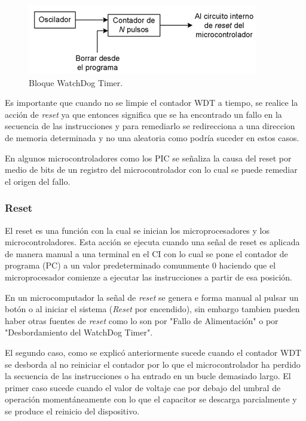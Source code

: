 \documentclass[letterpaper,12pt,oneside]{book}
\begin{document}
				\begin{figure}[!htpb]
					\centering
					\includegraphics[scale = 1.0]{Material de Consulta/BloqWDT.PNG}
					\caption[Bloque WatchDog Timer]{Bloque WatchDog Timer.}
					\label{BloqWDT}
				\end{figure}

				Es importante que cuando no se limpie el contador WDT a tiempo, se realice la acción de \textit{reset} ya que entonces significa que se ha encontrado un fallo en la secuencia de las instrucciones y para remediarlo se redirecciona a una direccion de memoria determinada y no una aleatoria como podría suceder en estos casos.

				En algunos microcontroladores como los PIC se señaliza la causa del reset por medio de bits de un registro del microcontrolador con lo cual se puede remediar el origen del fallo.

				\subsubsection{Reset}
				El reset es una función con la cual se inician los microprocesadores y los microcontroladores. Esta acción se ejecuta cuando una señal de reset es aplicada de manera manual a una terminal en el CI con lo cual se pone el contador de programa (PC) a un valor predeterminado comunmente 0 haciendo que el microprocesador comienze a ejecutar las instrucciones a partir de esa posición.

				En un microcomputador la señal de \textit{reset} se genera e forma manual al pulsar un botón o al iniciar el sistema (\textit{Reset} por encendido), sin embargo tambien pueden haber otras fuentes de \textit{reset} como lo son por "Fallo de Alimentación" o por "Desbordamiento del WatchDog Timer".

				El segundo caso, como se explicó anteriormente sucede cuando el contador WDT se desborda al no reiniciar el contador por lo que el microcontrolador ha perdido la secuencia de las instrucciones o ha entrado en un bucle demasiado largo. El primer caso sucede cuando el valor de voltaje cae por debajo del umbral de operación momentáneamente con lo que el capacitor se descarga parcialmente y se produce el reinicio del dispositivo.
\end{document}
